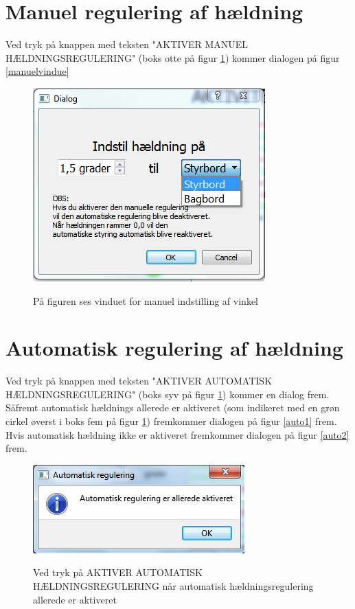 \section{Manuel regulering af hældning}
Ved tryk på knappen med teksten "AKTIVER MANUEL HÆLDNINGSREGULERING" (boks otte på figur \ref{fig:hovedvindue}) kommer dialogen på figur \ref{manuelvindue}
\begin{figure}[H]
\centering
\includegraphics[scale=1]{billeder/GUI/manuelvindue}
\label{fig:hovedvindue}
\caption{På figuren ses vinduet for manuel indstilling af vinkel}
\end{figure}

\section{Automatisk regulering af hældning}
Ved tryk på knappen med teksten "AKTIVER AUTOMATISK HÆLDNINGSREGULERING" (boks syv på figur \ref{fig:hovedvindue}) kommer en dialog frem. Såfremt automatisk hældnings allerede er aktiveret (som indikeret med en grøn cirkel øverst i boks fem på figur \ref{fig:hovedvindue}) fremkommer dialogen på figur \ref{auto1} frem.
Hvis automatisk hældning ikke er aktiveret fremkommer dialogen på figur \ref{auto2} frem.

\begin{figure}[h]
\centering
\includegraphics[scale=1]{billeder/GUI/auto1}
\label{fig:auto1}
\caption{Ved tryk på AKTIVER AUTOMATISK HÆLDNINGSREGULERING når automatisk hældningsregulering allerede er aktiveret}
\end{figure}

